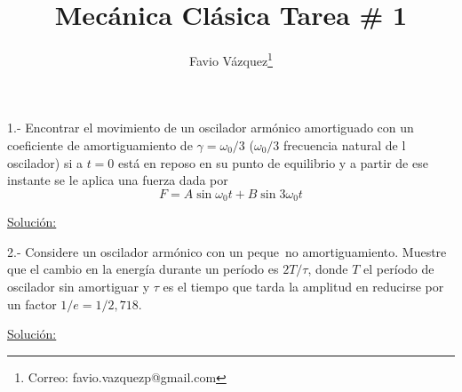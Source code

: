 \documentclass[a4paper,10pt]{article}
\title{Mec\'anica Cl\'asica Tarea \# 1}
\author{Favio V\'azquez\thanks{Correo: favio.vazquezp@gmail.com}}\affil{Instituto de F\'isica. Universidad Nacional Aut\'onoma de M\'exico}
\date{}
\begin{document}
\makeatletter
\def\@maketitle{%
  \newpage
  \null
  \vskip 2em%
  \begin{center}%
  \let \footnote \thanks
    {\Large\bfseries \@title \par}%
    \vskip 1.5em%
    {\normalsize
      \lineskip .5em%
      \begin{tabular}[t]{c}%
        \@author
      \end{tabular}\par}%
    \vskip 1em%
    {\normalsize \@date}%
  \end{center}%
  \par
  \vskip 1.5em}
\makeatother

\maketitle

1.- Encontrar el movimiento de un oscilador arm\'onico amortiguado
con un coeficiente de amortiguamiento de $\gamma = \omega_{0}/3$ 
($\omega_{0}/3$ frecuencia natural de l oscilador) si a $t=0$ est\'a 
en reposo en su punto de equilibrio y a partir de ese instante se le
aplica una fuerza dada por $$F=A\sin{\omega_{0}t}+B\sin{3\omega_{0}t}$$

\vspace{.3cm}

\underline{Soluci\'on:}

2.- Considere un oscilador arm\'onico con un peque~no amortiguamiento.
Muestre que el cambio en la energ\'ia durante un per\'iodo es $2T/\tau$,
donde $T$ el per\'iodo de oscilador sin amortiguar y $\tau$ es el tiempo
que tarda la amplitud en reducirse por un factor $1/e=1/2,718$.

\vspace{.3cm}

\underline{Soluci\'on:}
\end{document}
